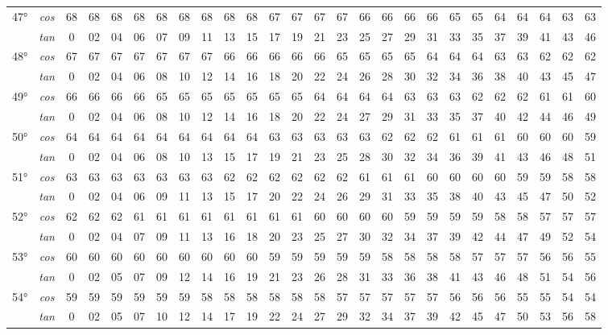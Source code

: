 \begin{tiny}
\begin{longtable}{c c |c |c |c |c |c |c |c |c |c |c |c |c |c |c |c |c |c |c |c |c |c |c |c |c}
		\multirow{2}{*}{47°}&\textit{cos}& 68& 68& 68& 68& 68& 68& 68& 68& 68& 67& 67& 67& 67& 66& 66& 66& 66& 65& 65& 64& 64& 64& 63& 63\\* \space&\textit{tan} & 0 & 02 & 04 & 06 & 07 & 09& 11& 13& 15& 17& 19& 21& 23& 25& 27& 29& 31& 33& 35& 37& 39& 41& 43& 46\\\hline
		\multirow{2}{*}{48°}&\textit{cos}& 67& 67& 67& 67& 67& 67& 67& 66& 66& 66& 66& 66& 65& 65& 65& 65& 64& 64& 64& 63& 63& 62& 62& 62\\* \space&\textit{tan} & 0 & 02 & 04 & 06 & 08& 10& 12& 14& 16& 18& 20& 22& 24& 26& 28& 30& 32& 34& 36& 38& 40& 43& 45& 47\\\hline
		\multirow{2}{*}{49°}&\textit{cos}& 66& 66& 66& 66& 65& 65& 65& 65& 65& 65& 65& 64& 64& 64& 64& 63& 63& 63& 62& 62& 62& 61& 61& 60\\* \space&\textit{tan} & 0 & 02 & 04 & 06 & 08& 10& 12& 14& 16& 18& 20& 22& 24& 27& 29& 31& 33& 35& 37& 40& 42& 44& 46& 49\\\hline
		\multirow{2}{*}{50°}&\textit{cos}& 64& 64& 64& 64& 64& 64& 64& 64& 64& 63& 63& 63& 63& 63& 62& 62& 62& 61& 61& 61& 60& 60& 60& 59\\* \space&\textit{tan} & 0 & 02 & 04 & 06 & 08& 10& 13& 15& 17& 19& 21& 23& 25& 28& 30& 32& 34& 36& 39& 41& 43& 46& 48& 51\\\hline
		\multirow{2}{*}{51°}&\textit{cos}& 63& 63& 63& 63& 63& 63& 63& 62& 62& 62& 62& 62& 62& 61& 61& 61& 60& 60& 60& 60& 59& 59& 58& 58\\* \space&\textit{tan} & 0 & 02 & 04 & 06 & 09& 11& 13& 15& 17& 20& 22& 24& 26& 29& 31& 33& 35& 38& 40& 43& 45& 47& 50& 52\\\hline
		\multirow{2}{*}{52°}&\textit{cos}& 62& 62& 62& 61& 61& 61& 61& 61& 61& 61& 61& 60& 60& 60& 60& 59& 59& 59& 59& 58& 58& 57& 57& 57\\* \space&\textit{tan} & 0 & 02 & 04 & 07 & 09& 11& 13& 16& 18& 20& 23& 25& 27& 30& 32& 34& 37& 39& 42& 44& 47& 49& 52& 54\\\hline
		\multirow{2}{*}{53°}&\textit{cos}& 60& 60& 60& 60& 60& 60& 60& 60& 60& 59& 59& 59& 59& 59& 58& 58& 58& 58& 57& 57& 57& 56& 56& 55\\* \space&\textit{tan} & 0 & 02 & 05 & 07 & 09& 12& 14& 16& 19& 21& 23& 26& 28& 31& 33& 36& 38& 41& 43& 46& 48& 51& 54& 56\\\hline
		\multirow{2}{*}{54°}&\textit{cos}& 59& 59& 59& 59& 59& 59& 58& 58& 58& 58& 58& 58& 57& 57& 57& 57& 57& 56& 56& 56& 55& 55& 54& 54\\* \space&\textit{tan} & 0 & 02 & 05 & 07& 10& 12& 14& 17& 19& 22& 24& 27& 29& 32& 34& 37& 39& 42& 45& 47& 50& 53& 56& 58\\\hline

\end{longtable}
\end{tiny}
